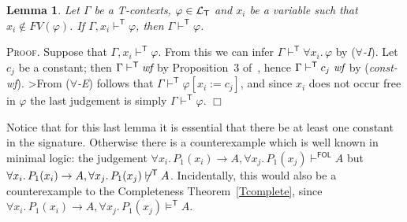 \documentclass{article}
\newtheorem{lemma}[definition]{Lemma}
\newenvironment{proof}{\smallskip\textsc{Proof.}}{\hspace*{\fill}$\Box$}
\newcommand{\T}{\textsf T}
\newcommand{\ok}{\mbox{\em wf}}
\newcommand{\wf}{\ \mbox{\em wf}}
\newcommand{\lang}[1]{\ensuremath{{\cal L}_{\mathsf{#1}}}}
\newcommand{\myvdash}[1]{\ensuremath{\vdash^{\mathsf{#1}}}}
\newcommand{\yields}[1]{\ensuremath{\models^{\mathsf{#1}}}}
\def\sep{.\,}
\begin{document}
\begin{lemma}\label{Textravars} Let $\Gamma$ be a {\T}-contexts,
$\varphi\in\lang{T}$ and $x_i$ be a variable such that
$x_i\not\in FV(\varphi)$.  If $\Gamma,x_i\myvdash{T}\varphi$, then
$\Gamma\myvdash{T}\varphi$.
\end{lemma}
\begin{proof}
Suppose that $\Gamma,x_i\myvdash{T}\varphi$.  From this we can
infer $\Gamma\myvdash{T}\forall x_i\sep\varphi$ by (\emph{$\forall$-I}).
Let $c_j$ be a constant; then $\Gamma\myvdash{T}\ok$ by Proposition~3
of~\cite{wie:zwa:03}, hence $\Gamma\myvdash{T}c_j\wf$ by (\emph{const-wf}).
>From (\emph{$\forall$-E}) follows that $\Gamma\myvdash{T}\varphi[x_i:=c_j]$,
and since $x_i$ does not occur free in $\varphi$ the last judgement is simply
$\Gamma\myvdash{T}\varphi$.
%
%
\end{proof}

\bigskip\noindent
Notice that for this last lemma it is essential that there be at least one
constant in the signature.  Otherwise there is a counterexample which is
well known in minimal logic: the judgement
$\forall x_i\sep P_1(x_i)\to A,\forall x_j\sep P_1(x_j)\myvdash{FOL}A$
but $\forall x_i\sep P_1(x_i)\to A,\forall x_j\sep P_1(x_j)\not\myvdash{T}A$.
Incidentally, this would also be a counterexample to the Completeness
Theorem~\ref{Tcomplete}, since
$\forall x_i\sep P_1(x_i)\to A,\forall x_j\sep P_1(x_j)\yields{T}A$.
\end{document}
